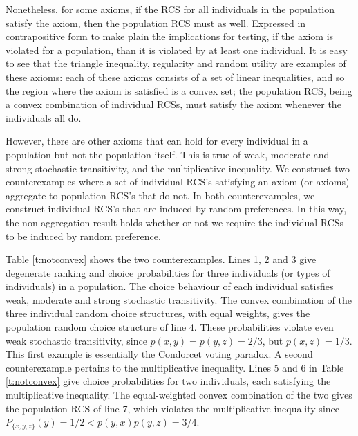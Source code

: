 \documentclass[11pt,letter]{article}
\begin{document}
Nonetheless, for some axioms, if the RCS for all individuals in the population satisfy the axiom, then the population RCS must as well.
Expressed in contrapositive form to make plain the implications for testing, if the axiom is violated for a population, than it is violated by at least one individual.
It is easy to see that the triangle inequality, regularity and random utility are examples of these axioms:
each of these axioms consists of a set of linear inequalities, and so the region where the axiom is satisfied is a convex set; the population RCS, being a convex combination of individual RCSs, must satisfy the axiom whenever the individuals all do.

However, there are other axioms that can hold for every individual in a population but not the population itself.
This is true of weak, moderate and strong stochastic transitivity, and the multiplicative inequality.
We construct two counterexamples where a set of individual RCS's satisfying an axiom (or axioms) aggregate to population RCS's that do not.
In both counterexamples, we construct individual RCS's that are induced by random preferences.
In this way, the non-aggregation result holds whether or not we require the individual RCSs to be induced by random preference.

Table \ref{t:notconvex} shows the two counterexamples. 
Lines 1, 2 and 3 give degenerate ranking and choice probabilities for three individuals (or types of individuals) in a population.
The choice behaviour of each individual satisfies weak, moderate and strong stochastic transitivity.
The convex combination of the three individual random choice structures, with equal weights, gives the population random choice structure of line 4.
These probabilities violate even weak stochastic transitivity, since $p(x,y) = p(y,z) = 2/3$, but $p(x,z) = 1/3$.
This first example is essentially the Condorcet voting paradox.
A second counterexample pertains to the multiplicative inequality.
Lines 5 and 6 in Table \ref{t:notconvex} give choice probabilities for two individuals, each satisfying the multiplicative inequality.
The equal-weighted convex combination of the two gives the population RCS of line 7,
which violates the multiplicative inequality since $P_{\{x,y,z\}}(y) = 1/2 < p(y,x)p(y,z) = 3/4$.
\end{document}
